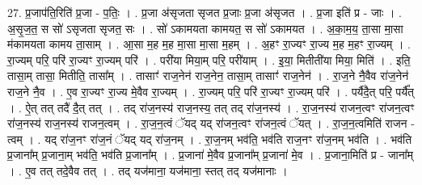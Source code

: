 \documentclass[17pt]{extarticle}
\begin{document}
27. प्र॒जाप॑ति॒रिति॑ प्र॒जा - प॒तिः॒ । . प्र॒जा अ॑सृजता सृजत प्र॒जाः प्र॒जा अ॑सृजत । . प्र॒जा इति॑ प्र - जाः । . अ॒सृ॒ज॒त॒ स सो॑ ऽसृजता सृजत॒ सः । . सो॑ ऽकामयता कामयत॒ स सो॑ ऽकामयत । . अ॒का॒म॒य॒ ता॒सा मा॒सा म॑कामयता कामय ता॒साम् । . आ॒सा म॒ह म॒ह मा॒सा मा॒सा म॒हम् । . अ॒हꣳ रा॒ज्यꣳ रा॒ज्य म॒ह म॒हꣳ रा॒ज्यम् । . रा॒ज्यम् परि॒ परि॑ रा॒ज्यꣳ रा॒ज्यम् परि॑ । . परी॑या मिया॒म् परि॒ परी॑याम् । . इ॒या॒ मितीती॑या मिया॒ मिति॑ । . इति॒ तासा॒म् तासा॒ मितीति॒ तासा᳚म् । . तासाꣳ॑ राज॒नेन॑ राज॒नेन॒ तासा॒म् तासाꣳ॑ राज॒नेन॑ । . रा॒ज॒ने नै॒वैव रा॑ज॒नेन॑ राज॒ने नै॒व । . ए॒व रा॒ज्यꣳ रा॒ज्य मे॒वैव रा॒ज्यम् । . रा॒ज्यम् परि॒ परि॑ रा॒ज्यꣳ रा॒ज्यम् परि॑ । . पर्यै॑दै॒त् परि॒ पर्यै᳚त् । . ऐ॒त् तत् तदै॑ दै॒त् तत् । . तद् रा॑ज॒नस्य॑ राज॒नस्य॒ तत् तद् रा॑ज॒नस्य॑ । . रा॒ज॒नस्य॑ राजन॒त्वꣳ रा॑जन॒त्वꣳ रा॑ज॒नस्य॑ राज॒नस्य॑ राजन॒त्वम् । . रा॒ज॒न॒त्वं ॅयद् यद् रा॑जन॒त्वꣳ रा॑जन॒त्वं ॅयत् । . रा॒ज॒न॒त्वमिति॑ राजन - त्वम् । . यद् रा॑ज॒नꣳ रा॑ज॒नं ॅयद् यद् रा॑ज॒नम् । . रा॒ज॒नम् भव॑ति॒ भव॑ति राज॒नꣳ रा॑ज॒नम् भव॑ति । . भव॑ति प्र॒जाना᳚म् प्र॒जाना॒म् भव॑ति॒ भव॑ति प्र॒जाना᳚म् । . प्र॒जाना॑ मे॒वैव प्र॒जाना᳚म् प्र॒जाना॑ मे॒व । . प्र॒जाना॒मिति॑ प्र - जाना᳚म् । . ए॒व तत् तदे॒वैव तत् । . तद् यज॑माना॒ यज॑माना॒ स्तत् तद् यज॑मानाः । \newline
\end{document}

